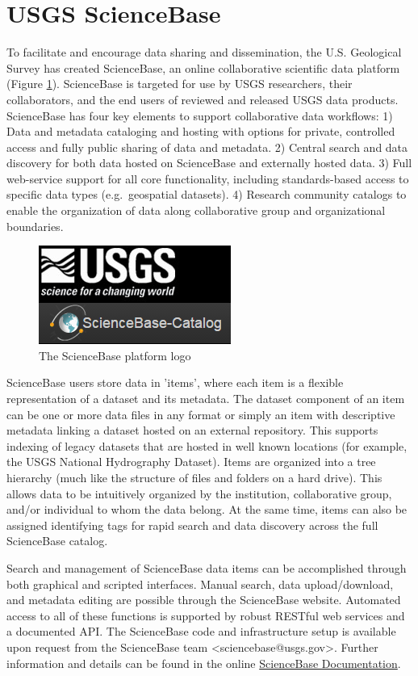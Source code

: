 \section{USGS ScienceBase}

To facilitate and encourage data sharing and dissemination,
the U.S. Geological Survey has created ScienceBase, an online
collaborative scientific data platform (Figure \ref{figure:sbfig}).
ScienceBase is targeted for use by USGS researchers, their collaborators, 
and the end users of reviewed and released USGS data products.
ScienceBase has four key elements to support collaborative
data workflows: 1) Data and metadata
cataloging and hosting with options for private, controlled access
and fully public sharing of data and metadata. 2) Central search and
data discovery for both data hosted on ScienceBase and externally hosted 
data. 3) Full web-service support for all core functionality, including
standards-based access to specific data types (e.g.\ geospatial
datasets). 4) Research community catalogs to
enable the organization of data along collaborative group and
organizational boundaries.

 \begin{figure}[htbp]
   \centering
   \includegraphics{sblogo}
   \caption{The ScienceBase platform logo}
   \label{figure:sbfig}
 \end{figure}

ScienceBase users store data in 'items', where each item is a flexible
representation of a dataset and its metadata. The dataset component of an
item can be one or more data files in any format or simply an item with descriptive
metadata linking a dataset hosted on an external repository. This supports
indexing of legacy datasets that are hosted in well known locations (for example, 
the USGS National Hydrography Dataset). Items are organized into a tree hierarchy 
(much like the structure of files and
folders on a hard drive). This allows data to be intuitively organized by the
institution, collaborative group, and/or individual to whom
the data belong. At the same time, items can also be assigned identifying tags
for rapid search and data discovery across the full ScienceBase catalog.

Search and management of ScienceBase data items can be accomplished through
both graphical and scripted interfaces. Manual search, data upload/download, and
metadata editing are possible through the ScienceBase website.
Automated access to all of these functions is supported by robust RESTful web
services and a documented API. The ScienceBase code and infrastructure setup 
is available upon request from the ScienceBase team <sciencebase@usgs.gov>. 
Further information and details can be found in the online 
\href{https://www.sciencebase.gov/about/using-sciencebase}{ScienceBase Documentation}.
